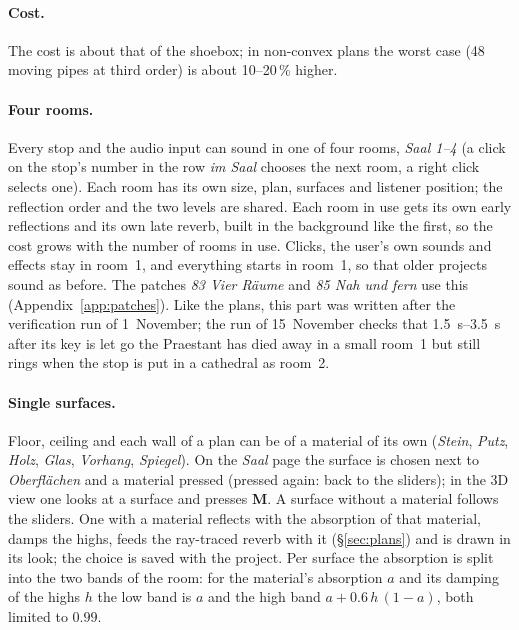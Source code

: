 \documentclass[11pt,a4paper,parskip=half,DIV=11,toc=bibliography]{scrartcl}
\newcommand{\ui}[1]{\emph{#1}}                 %
\begin{document}
\paragraph{Cost.} The cost is about that of the shoebox; in non-convex plans the worst case (48 moving pipes at
third order) is about 10--20\,\% higher.

\paragraph{Four rooms.} Every stop and the audio input can sound in one of four rooms, \ui{Saal 1--4} (a click on
the stop's number in the row \ui{im Saal} chooses the next room, a right click selects one). Each room has its
own size, plan, surfaces and listener position; the reflection order and the two levels are shared. Each room in
use gets its own early reflections and its own late reverb, built in the background like the first, so the cost
grows with the number of rooms in use. Clicks, the user's own sounds and effects stay in room~1, and everything
starts in room~1, so that older projects sound as before. The patches \ui{83 Vier Räume} and \ui{85 Nah und fern}
use this (Appendix~\ref{app:patches}). Like the plans, this part was written after the verification run of 1~November; the run of
15~November checks that \SIrange{1.5}{3.5}{s} after its key is let go the Praestant has died away in a small room~1 but still rings when the stop
is put in a cathedral as room~2.

\paragraph{Single surfaces.}\label{sec:surfaces} Floor, ceiling and each wall of a plan can be of a material of its own (\ui{Stein},
\ui{Putz}, \ui{Holz}, \ui{Glas}, \ui{Vorhang}, \ui{Spiegel}). On the \ui{Saal} page the surface is chosen next to \ui{Oberflächen} and a material
pressed (pressed again: back to the sliders); in the 3D view one looks at a surface and presses \textbf{M}. A surface without a material
follows the sliders. One with a material reflects with the absorption of that material, damps the highs, feeds the ray-traced reverb with
it (\S\ref{sec:plans}) and is drawn in its look; the choice is saved with the project. Per surface the absorption is split into the two bands of
the room: for the material's absorption $a$ and its damping of the highs $h$ the low band is $a$ and the high band
$a + 0.6\,h\,(1-a)$, both limited to $0.99$.
\end{document}
